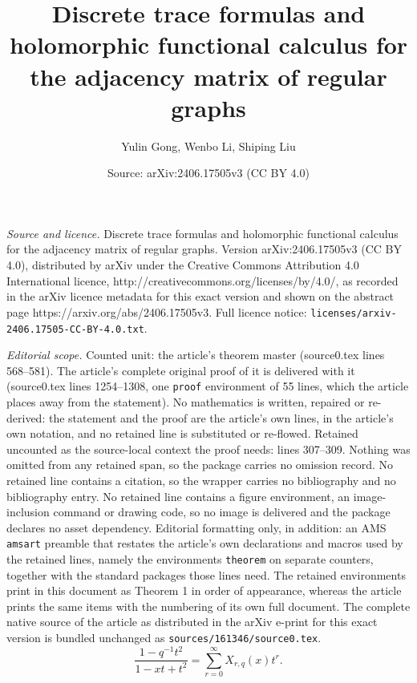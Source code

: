 \documentclass[10pt,a4paper]{amsart}
\title{Discrete trace formulas and holomorphic functional calculus for the adjacency matrix of regular graphs}
\author{Yulin Gong, Wenbo Li, Shiping Liu}
\date{Source: arXiv:2406.17505v3 (CC BY 4.0)}
\begin{document}
\maketitle

\noindent\emph{Source and licence.} Discrete trace formulas and holomorphic functional calculus for the adjacency matrix of regular graphs. Version arXiv:2406.17505v3 (CC BY 4.0), distributed by arXiv under the Creative Commons Attribution 4.0 International licence, http://creativecommons.org/licenses/by/4.0/, as recorded in the arXiv licence metadata for this exact version and shown on the abstract page https://arxiv.org/abs/2406.17505v3. Full licence notice: \texttt{licenses/arxiv-2406.17505-CC-BY-4.0.txt}.\par\smallskip

\noindent\textit{Editorial scope.} Counted unit: the article's theorem master (source0.tex lines 568--581). The article's complete original proof of it is delivered with it (source0.tex lines 1254--1308, one \texttt{proof} environment of 55 lines, which the article places away from the statement). No mathematics is written, repaired or re-derived: the statement and the proof are the article's own lines, in the article's own notation, and no retained line is substituted or re-flowed.  Retained uncounted as the source-local context the proof needs: lines 307--309.  Nothing was omitted from any retained span, so the package carries no omission record.  No retained line contains a citation, so the wrapper carries no bibliography and no bibliography entry.  No retained line contains a figure environment, an image-inclusion command or drawing code, so no image is delivered and the package declares no asset dependency.  Editorial formatting only, in addition: an AMS \texttt{amsart} preamble that restates the article's own declarations and macros used by the retained lines, namely the environments \texttt{theorem} on separate counters, together with the standard packages those lines need.  The retained environments print in this document as Theorem 1 in order of appearance, whereas the article prints the same items with the numbering of its own full document.  The complete native source of the article as distributed in the arXiv e-print for this exact version is bundled unchanged as \texttt{sources/161346/source0.tex}.
    \begin{equation}\label{Xrqgeneratingfunction}
    \frac{1-q^{-1}t^2}{1-xt+t^2}=\sum_{r=0}^{\infty}X_{r,q}(x)t^{r}.
    \end{equation}
\end{document}
